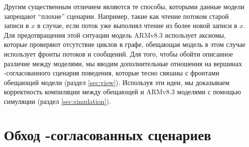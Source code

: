 Другим существенным отличием являются те способы, которыми данные модели запрещают ``плохие'' сценарии.  Например,
такие как чтение потоком старой записи в $x$ в случае, если поток уже выполнял чтение из более новой записи в $x$.
Для предотвращения этой ситуации модель ARMv8.3 использует аксиомы, которые проверяют отсутствие циклов в графе, 
обещающая модель в этом случае использует фронты потоков и сообщений.
Для того, чтобы обойти описанное различие между моделями,
мы вводим дополнительные отношения на вершинах \ARM-согласованного сценария поведения,
которые тесно связаны с фронтами обещающей модели (раздел \ref{sec:view}).
Используя эти идеи, мы доказываем корректность компиляции между обещающей и ARMv8.3 моделями
с помощью симуляции (раздел \ref{sec:simulation}).
%

\section{Обход \ARM-согласованных сценариев}
\label{sec:traversal}

